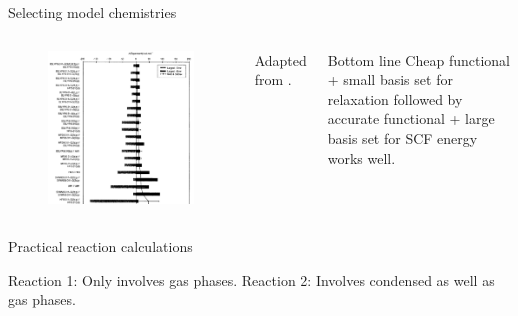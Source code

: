 \documentclass[aspectratio=169]{beamer}
\begin{document}
\begin{frame}{Selecting model chemistries}
\begin{columns}
\begin{figure}
    \centering
    \includegraphics[width=0.45\linewidth]{lectures/figures/4_model_chem.png}
\end{figure}
Adapted from \cite{foresmanExploringChemistryElectronic1996}.

\begin{alertblock}{Bottom line}
Cheap functional + small basis set for relaxation followed by accurate functional + large basis set for SCF energy works well.
    
\end{alertblock}

\end{columns} 

\end{frame} 

\begin{frame}{Practical reaction calculations}

Reaction 1: Only involves gas phases.\newline
\newline
{}\newline
\newline
Reaction 2: Involves condensed as well as gas phases.\newline
\newline
{}

\end{frame} 
\end{document}
